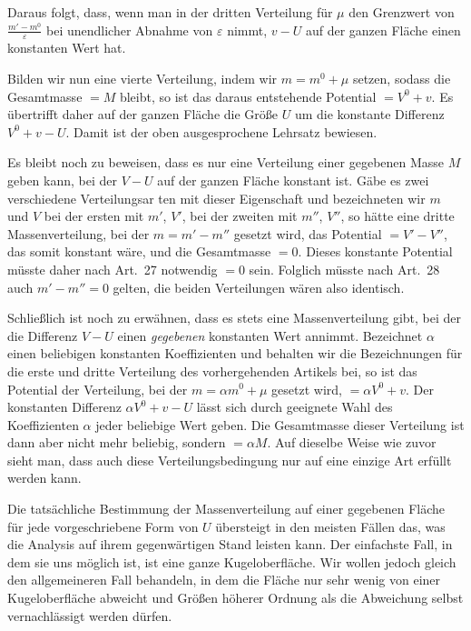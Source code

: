 Daraus folgt, dass, wenn man in der dritten Verteilung für $\mu$ den Grenzwert von $\frac{m'-m^0}{\varepsilon}$ bei unendlicher Abnahme von $\varepsilon$ nimmt, $v-U$ auf der ganzen Fläche einen konstanten Wert hat.

Bilden wir nun eine vierte Verteilung, indem wir $m=m^0+\mu$ setzen, sodass die Gesamtmasse $=M$ bleibt, so ist das daraus entstehende Potential $=V^0+v$. Es übertrifft daher auf der ganzen Fläche die Größe $U$ um die konstante Differenz $V^0+v-U$. Damit ist der oben ausgesprochene Lehrsatz bewiesen.

Es bleibt noch zu beweisen, dass es nur eine Verteilung einer gegebenen Masse $M$ geben kann, bei der $V-U$ auf der ganzen Fläche konstant ist. Gäbe es zwei verschiedene Verteilungsar%
%
ten mit dieser Eigenschaft und bezeichneten wir $m$ und $V$ bei der ersten mit $m'$, $V'$, bei der zweiten mit $m''$, $V''$, so hätte eine dritte Massenverteilung, bei der $m=m'-m''$ gesetzt wird, das Potential $=V'-V''$, das somit konstant wäre, und die Gesamtmasse $=0$. Dieses konstante Potential müsste daher nach Art.\ 27 notwendig $=0$ sein. Folglich müsste nach Art.\ 28 auch $m'-m''=0$ gelten, die beiden Verteilungen wären also identisch.

Schließlich ist noch zu erwähnen, dass es stets eine Massenverteilung gibt, bei der die Differenz $V-U$ einen \textit{gegebenen} konstanten Wert annimmt. Bezeichnet $\alpha$ einen beliebigen konstanten Koeffizienten und behalten wir die Bezeichnungen für die erste und dritte Verteilung des vorhergehenden Artikels bei, so ist das Potential der Verteilung, bei der $m=\alpha m^0+\mu$ gesetzt wird, $=\alpha V^0+v$. Der konstanten Differenz $\alpha V^0+v-U$ lässt sich durch geeignete Wahl des Koeffizienten $\alpha$ jeder beliebige Wert geben. Die Gesamtmasse dieser Verteilung ist dann aber nicht mehr beliebig, sondern $=\alpha M$. Auf dieselbe Weise wie zuvor sieht man, dass auch diese Verteilungsbedingung nur auf eine einzige Art erfüllt werden kann.

Die tatsächliche Bestimmung der Massenverteilung auf einer gegebenen Fläche für jede vorgeschriebene Form von $U$ übersteigt in den meisten Fällen das, was die Analysis auf ihrem gegenwärtigen Stand leisten kann. Der einfachste Fall, in dem sie uns möglich ist, ist eine ganze Kugeloberfläche. Wir wollen jedoch gleich den allgemeineren Fall behandeln, in dem die Fläche nur sehr wenig von einer Kugeloberfläche abweicht und Größen höherer Ordnung als die Abweichung selbst vernachlässigt werden dürfen.

